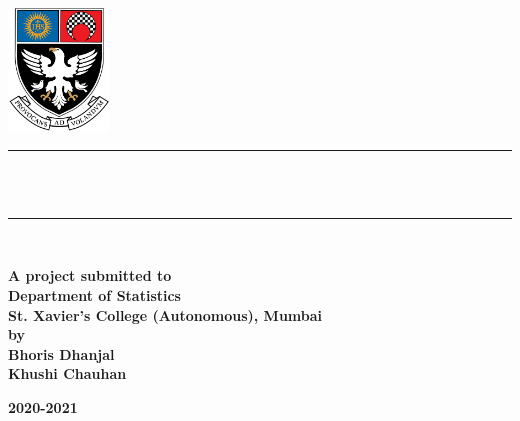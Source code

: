 \begin{titlepage}

\newcommand{\HRule}{\rule{\linewidth}{0.5mm}} %




\center %

\begin{center}
    



\includegraphics[width=0.2\textwidth]{Images/xavierslogo.png}\\[1.5cm]
\HRule \\[0.4cm]
{ \huge \bfseries \reporttitle}\\[0.4cm] %
\HRule \\[2.5cm]
\end{center}
\textbf{
\large A project submitted to\\
\large Department of Statistics\\
\large St. Xavier’s College (Autonomous), Mumbai\\
\large by\\[1cm]
\large Bhoris Dhanjal\\
Khushi Chauhan}

\vfill %
\textbf{
2020-2021}
\end{titlepage}
